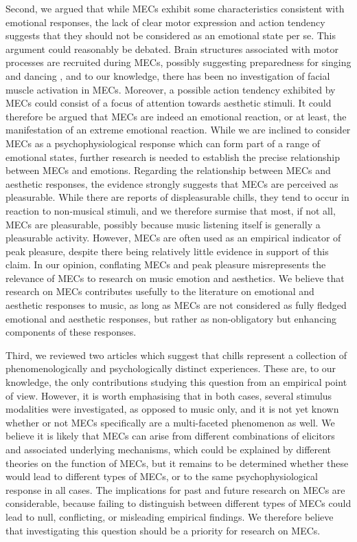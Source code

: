 Second, we argued that while MECs exhibit some characteristics consistent with emotional responses, the lack of clear motor expression and action tendency suggests that they should not be considered as an emotional state per se. This argument could reasonably be debated. Brain structures associated with motor processes are recruited during MECs, possibly suggesting preparedness for singing and dancing \parencite{brattico2013a}, and to our knowledge, there has been no investigation of facial muscle activation in MECs. Moreover, a possible action tendency exhibited by MECs could consist of a focus of attention towards aesthetic stimuli. It could therefore be argued that MECs are indeed an emotional reaction, or at least, the manifestation of an extreme emotional reaction. While we are inclined to consider MECs as a psychophysiological response which can form part of a range of emotional states, further research is needed to establish the precise relationship between MECs and emotions. Regarding the relationship between MECs and aesthetic responses, the evidence strongly suggests that MECs are perceived as pleasurable. While there are reports of displeasurable chills, they tend to occur in reaction to non-musical stimuli, and we therefore surmise that most, if not all, MECs are pleasurable, possibly because music listening itself is generally a pleasurable activity. However, MECs are often used as an empirical indicator of peak pleasure, despite there being relatively little evidence in support of this claim. In our opinion, conflating MECs and peak pleasure misrepresents the relevance of MECs to research on music emotion and aesthetics. We believe that research on MECs contributes usefully to the literature on emotional and aesthetic responses to music, as long as MECs are not considered as fully fledged emotional and aesthetic responses, but rather as non-obligatory but enhancing components of these responses.

Third, we reviewed two articles which suggest that chills represent a collection of phenomenologically and psychologically distinct experiences. These are, to our knowledge, the only contributions studying this question from an empirical point of view. However, it is worth emphasising that in both cases, several stimulus modalities were investigated, as opposed to music only, and it is not yet known whether or not MECs specifically are a multi-faceted phenomenon as well. We believe it is likely that MECs can arise from different combinations of elicitors and associated underlying mechanisms, which could be explained by different theories on the function of MECs, but it remains to be determined whether these would lead to different types of MECs, or to the same psychophysiological response in all cases. The implications for past and future research on MECs are considerable, because failing to distinguish between different types of MECs could lead to null, conflicting, or misleading empirical findings. We therefore believe that investigating this question should be a priority for research on MECs.

